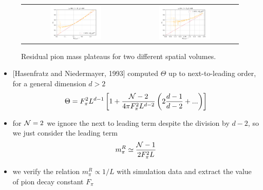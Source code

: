 \documentclass[a4paper,11pt]{article}
\begin{document}
\begin{figure}
  \begin{tabular}{cc}
    \includegraphics[width=0.5\textwidth]{figs/Mpi10x64} &
    \includegraphics[width=0.5\textwidth]{figs/Mpi6x64Pt10}
  \end{tabular}
  \caption{Residual pion mass plateaus for two different spatial volumes.}
\end{figure}

  \begin{itemize}
    \item {}[Hasenfratz and Niedermayer, 1993]\cite{Hasenfratz1993} computed
      $\Theta$ up to next-to-leading order, for a general dimension $d > 2$
      \[
        \Theta = F_\pi^2 L^{d-1} \left[1 +
          \frac{{\cal N} - 2}{4\pi F_\pi^2 L^{d-2}}
          \left(2\frac{d - 1}{d - 2} + ...\right) \right]
      \]
    \item for ${\cal N} = 2$ we ignore the next to leading term despite
      the division by $d - 2$,
      so we just consider the leading term
      \[
        m_\pi^R \simeq \frac{{\cal N} - 1}{2F_\pi^2 L}
      \]
    \item we verify the relation $m_\pi^R \propto 1 / L$ with
      simulation data and extract the value of pion decay
      constant $F_\pi$
  \end{itemize}
\end{document}
